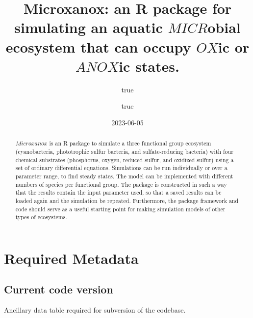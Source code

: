 \documentclass[
]{article}
\title{Microxanox: an R package for simulating an aquatic \(MICR\)obial ecosystem that can occupy \(OX\)ic or \(ANOX\)ic states.}
\author{true \and true}
\date{2023-06-05}
\begin{document}
\maketitle
\begin{abstract}
\(Microxanox\) is an R package to simulate a three functional group ecosystem (cyanobacteria, phototrophic sulfur bacteria, and sulfate-reducing bacteria) with four chemical substrates (phosphorus, oxygen, reduced sulfur, and oxidized sulfur) using a set of ordinary differential equations. Simulations can be run individually or over a parameter range, to find steady states. The model can be implemented with different numbers of species per functional group. The package is constructed in such a way that the results contain the input parameter used, so that a saved results can be loaded again and the simulation be repeated. Furthermore, the package framework and code should serve as a useful starting point for making simulation models of other types of ecosystems.
\end{abstract}

{
\hypersetup{linkcolor=}
\setcounter{tocdepth}{2}
\tableofcontents
}
\pagebreak

\hypertarget{required-metadata}{%
\section{Required Metadata}\label{required-metadata}}

\hypertarget{current-code-version}{%
\subsection{Current code version}\label{current-code-version}}

Ancillary data table required for subversion of the codebase.
\end{document}
